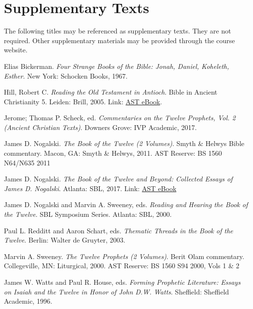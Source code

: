 \documentclass[titlepage]{article}
\begin{document}
\section{Supplementary Texts}
\label{supplementary}

The following titles may be referenced as supplementary texts. They are
not required. Other supplementary materials may be provided through the
course website.

\begingroup
\renewcommand{\section}[2]{}%
\begin{thebibliography}{3}%

	 Elias Bickerman.
	\emph{Four Strange Books of the Bible: Jonah, Daniel, Koheleth, Esther}.
	New York: Schocken Books, 1967.

	 Hill, Robert C.
	\emph{Reading the Old Testament in Antioch}. Bible in Ancient Christianity 5.
	Leiden: Brill, 2005. Link: \href{http://ezproxy.astheology.ns.ca:2048/login?url=http://search.ebscohost.com/login.aspx?direct=true&db=nlebk&AN=173885&site=ehost-live&scope=site}{AST eBook}.

	 Jerome; Thomas P. Scheck, ed.
	\emph{Commentaries on the Twelve Prophets, Vol. 2 (Ancient Christian Texts)}.
	Downers Grove: IVP Academic, 2017.

	 James D. Nogalski.
	\emph{The Book of the Twelve (2 Volumes)}. Smyth \& Helwys Bible commentary.
	Macon, GA: Smyth \& Helwys, 2011. AST Reserve: BS 1560 N64/N635 2011

	 James D. Nogalski.
	\emph{The Book of the Twelve and Beyond: Collected Essays of James D. Nogalski}.
	Atlanta: SBL, 2017. Link: \href{http://ezproxy.astheology.ns.ca:2048/login?url=http://search.ebscohost.com/login.aspx?direct=true&db=nlebk&AN=1557940&site=ehost-live&scope=site}{AST eBook}

	 James D. Nogalski and Marvin A. Sweeney, eds.
	\emph{Reading and Hearing the Book of the Twelve}. SBL Symposium Series.
	Atlanta: SBL, 2000.

	 Paul L. Redditt and Aaron Schart, eds.
	\emph{Thematic Threads in the Book of the Twelve}.
	Berlin: Walter de Gruyter, 2003.

	 Marvin A. Sweeney.
	\emph{The Twelve Prophets (2 Volumes)}. Berit Olam commentary.
	Collegeville, MN: Liturgical, 2000. AST Reserve: BS 1560 S94 2000, Vols 1 \& 2

	 James W. Watts and Paul R. House, eds.
	\emph{Forming Prophetic Literature: Essays on Isaiah and the Twelve in Honor of John D.W. Watts}.
	Sheffield: Sheffield Academic, 1996.

\end{thebibliography}
\endgroup
\end{document}
